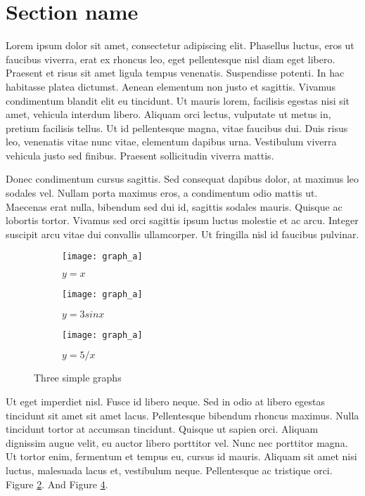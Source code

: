 \section{Section name}
Lorem ipsum dolor sit amet, consectetur adipiscing elit. Phasellus luctus, eros ut faucibus viverra, erat ex rhoncus leo, eget pellentesque nisl diam eget libero. Praesent et risus sit amet ligula tempus venenatis. Suspendisse potenti. In hac habitasse platea dictumst. Aenean elementum non justo et sagittis. Vivamus condimentum blandit elit eu tincidunt. Ut mauris lorem, facilisis egestas nisi sit amet, vehicula interdum libero. Aliquam orci lectus, vulputate ut metus in, pretium facilisis tellus. Ut id pellentesque magna, vitae faucibus dui. Duis risus leo, venenatis vitae nunc vitae, elementum dapibus urna. Vestibulum viverra vehicula justo sed finibus. Praesent sollicitudin viverra mattis.

Donec condimentum cursus sagittis. Sed consequat dapibus dolor, at maximus leo sodales vel. Nullam porta maximus eros, a condimentum odio mattis ut. Maecenas erat nulla, bibendum sed dui id, sagittis sodales mauris. Quisque ac lobortis tortor. Vivamus sed orci sagittis ipsum luctus molestie et ac arcu. Integer suscipit arcu vitae dui convallis ullamcorper. Ut fringilla nisl id faucibus pulvinar.

\begin{figure}
     \centering
     \begin{subfigure}[b]{0.3\textwidth}
         \centering
         \texttt{[image: graph\_a]}
         \caption{$y=x$}
         \label{fig:y equals x}
     \end{subfigure}
     \hfill
     \begin{subfigure}[b]{0.3\textwidth}
         \centering
         \texttt{[image: graph\_a]}
         \caption{$y=3sinx$}
         \label{fig:three sin x}
     \end{subfigure}
     \hfill
     \begin{subfigure}[b]{0.3\textwidth}
         \centering
         \texttt{[image: graph\_a]}
         \caption{$y=5/x$}
         \label{fig:five over x}
     \end{subfigure}
        \caption{Three simple graphs}
        \label{fig:three graphs}
\end{figure}

Ut eget imperdiet nisl. Fusce id libero neque. Sed in odio at libero egestas tincidunt sit amet sit amet lacus. Pellentesque bibendum rhoncus maximus. Nulla tincidunt tortor at accumsan tincidunt. Quisque ut sapien orci. Aliquam dignissim augue velit, eu auctor libero porttitor vel. Nunc nec porttitor magna. Ut tortor enim, fermentum et tempus eu, cursus id mauris. Aliquam sit amet nisi luctus, malesuada lacus et, vestibulum neque. Pellentesque ac tristique orci. Figure \ref{fig:three sin x}. And Figure \ref{fig:three graphs}.

